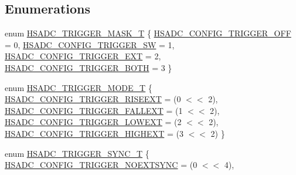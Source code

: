 \subsection*{Enumerations}
\begin{DoxyCompactItemize}
\item 
enum \hyperlink{group___h_s_a_d_c__18_x_x__43_x_x_gabacdffe94b42f1dc1c339dab9a20772c}{H\+S\+A\+D\+C\+\_\+\+T\+R\+I\+G\+G\+E\+R\+\_\+\+M\+A\+S\+K\+\_\+T} \{ \hyperlink{group___h_s_a_d_c__18_x_x__43_x_x_ggabacdffe94b42f1dc1c339dab9a20772caacc058b469367e54d9cb0b79c893c27b}{H\+S\+A\+D\+C\+\_\+\+C\+O\+N\+F\+I\+G\+\_\+\+T\+R\+I\+G\+G\+E\+R\+\_\+\+O\+FF} = 0, 
\hyperlink{group___h_s_a_d_c__18_x_x__43_x_x_ggabacdffe94b42f1dc1c339dab9a20772ca60a0ed78169b3ca42913125055400dd1}{H\+S\+A\+D\+C\+\_\+\+C\+O\+N\+F\+I\+G\+\_\+\+T\+R\+I\+G\+G\+E\+R\+\_\+\+SW} = 1, 
\hyperlink{group___h_s_a_d_c__18_x_x__43_x_x_ggabacdffe94b42f1dc1c339dab9a20772caa757019f18616753839c7817d7e633d9}{H\+S\+A\+D\+C\+\_\+\+C\+O\+N\+F\+I\+G\+\_\+\+T\+R\+I\+G\+G\+E\+R\+\_\+\+E\+XT} = 2, 
\hyperlink{group___h_s_a_d_c__18_x_x__43_x_x_ggabacdffe94b42f1dc1c339dab9a20772ca565a4a6ef822ca662af662b13d06c4b9}{H\+S\+A\+D\+C\+\_\+\+C\+O\+N\+F\+I\+G\+\_\+\+T\+R\+I\+G\+G\+E\+R\+\_\+\+B\+O\+TH} = 3
 \}
\item 
enum \hyperlink{group___h_s_a_d_c__18_x_x__43_x_x_gab4aa68023c03604cc1333eed859073e9}{H\+S\+A\+D\+C\+\_\+\+T\+R\+I\+G\+G\+E\+R\+\_\+\+M\+O\+D\+E\+\_\+T} \{ \hyperlink{group___h_s_a_d_c__18_x_x__43_x_x_ggab4aa68023c03604cc1333eed859073e9ad7129b13b7955c2995a91774947869f2}{H\+S\+A\+D\+C\+\_\+\+C\+O\+N\+F\+I\+G\+\_\+\+T\+R\+I\+G\+G\+E\+R\+\_\+\+R\+I\+S\+E\+E\+XT} = (0 $<$$<$ 2), 
\hyperlink{group___h_s_a_d_c__18_x_x__43_x_x_ggab4aa68023c03604cc1333eed859073e9ac157643a91f076c5864d316234f72c0f}{H\+S\+A\+D\+C\+\_\+\+C\+O\+N\+F\+I\+G\+\_\+\+T\+R\+I\+G\+G\+E\+R\+\_\+\+F\+A\+L\+L\+E\+XT} = (1 $<$$<$ 2), 
\hyperlink{group___h_s_a_d_c__18_x_x__43_x_x_ggab4aa68023c03604cc1333eed859073e9a15370950a068bae8a811f325302e2afe}{H\+S\+A\+D\+C\+\_\+\+C\+O\+N\+F\+I\+G\+\_\+\+T\+R\+I\+G\+G\+E\+R\+\_\+\+L\+O\+W\+E\+XT} = (2 $<$$<$ 2), 
\hyperlink{group___h_s_a_d_c__18_x_x__43_x_x_ggab4aa68023c03604cc1333eed859073e9acdf358d24d8f8407d365a01f7a671419}{H\+S\+A\+D\+C\+\_\+\+C\+O\+N\+F\+I\+G\+\_\+\+T\+R\+I\+G\+G\+E\+R\+\_\+\+H\+I\+G\+H\+E\+XT} = (3 $<$$<$ 2)
 \}
\item 
enum \hyperlink{group___h_s_a_d_c__18_x_x__43_x_x_ga2b37f3b76e8523e0035f2b275ddb36ce}{H\+S\+A\+D\+C\+\_\+\+T\+R\+I\+G\+G\+E\+R\+\_\+\+S\+Y\+N\+C\+\_\+T} \{ \hyperlink{group___h_s_a_d_c__18_x_x__43_x_x_gga2b37f3b76e8523e0035f2b275ddb36ceae6d8612bb563af3ba4e3a484208a0f1f}{H\+S\+A\+D\+C\+\_\+\+C\+O\+N\+F\+I\+G\+\_\+\+T\+R\+I\+G\+G\+E\+R\+\_\+\+N\+O\+E\+X\+T\+S\+Y\+NC} = (0 $<$$<$ 4), 
$$
\end{DoxyCompactItemize}
